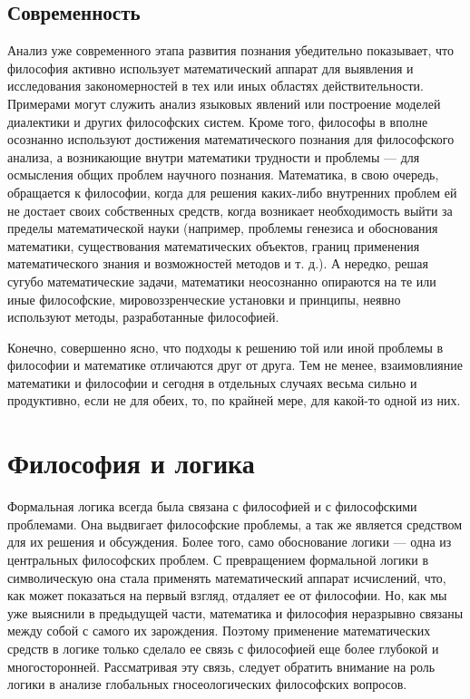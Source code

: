 \documentclass[a4page]{article}
\begin{document}
\subsection{Современность}
Анализ уже современного этапа развития познания убедительно показывает,
что философия активно использует математический аппарат для выявления
и исследования закономерностей в тех или иных областях действительности.
Примерами могут служить анализ языковых явлений или
построение моделей диалектики и других философских систем.
Кроме того, философы в вполне осознанно используют
достижения математического познания для философского анализа,
а возникающие внутри математики трудности и проблемы ---
для осмысления общих проблем научного познания.
Математика, в свою очередь, обращается к философии,
когда для решения каких-либо внутренних проблем ей не достает своих собственных средств,
когда возникает необходимость выйти за пределы математической науки
(например, проблемы генезиса и обоснования математики,
существования математических объектов,
границ применения математического знания и возможностей методов и т. д.).
А нередко, решая сугубо математические задачи,
математики неосознанно опираются на те или иные философские,
мировоззренческие установки и принципы, неявно используют методы, разработанные философией.

Конечно, совершенно ясно,
что подходы к решению той или иной проблемы в философии и математике отличаются друг от друга.
Тем не менее, взаимовлияние математики и философии и сегодня в отдельных случаях
весьма сильно и продуктивно, если не для обеих, то, по крайней мере, для какой-то одной из них.

\section{Философия и логика}
Формальная логика всегда была связана с философией и с философскими проблемами.
Она выдвигает философские проблемы, а так же является средством для их решения и обсуждения.
Более того, само обоснование логики --- одна из центральных философских проблем.
С превращением формальной логики в символическую она стала применять математический аппарат исчислений,
что, как может показаться на первый взгляд, отдаляет ее от философии.
Но, как мы уже выяснили в предыдущей части,
математика и философия неразрывно связаны между собой с самого их зарождения.
Поэтому применение математических средств в логике
только сделало ее связь с философией еще более глубокой и многосторонней.
Рассматривая эту связь,
следует обратить внимание на роль логики в анализе глобальных гносеологических философских вопросов.
\end{document}
